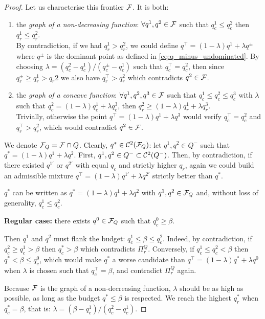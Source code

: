 \begin{proof}
Let us characterise this frontier $\mathcal{F}$. It is both:
\begin{enumerate}
    \item the \emph{graph of a non-decreasing function}: $\forall q^1, q^2\in\mathcal{F}$ such that $q_c^1\leq q_c^2$ then $q_r^1\leq q_r^2$.\\
    By contradiction, if we had $q_r^1 > q_r^2$, we could define $q^\top = (1-\lambda)q^1 + \lambda q^\pm$ where $q^\pm$ is the dominant point as defined in \eqref{eq:q_minus_undominated}. By choosing $\lambda=(q^2_c-q^1_c)/(q^\pm_c-q^1_c)$ such that $q^\top_c = q_c^2$, then since $q_r^\pm \geq q_r^1 > q_r 2$ we also have $q^\top_r > q_r^2$ which contradicts $q^2\in\mathcal{F}$.
    \item the \emph{graph of a concave function}: $\forall q^1, q^2, q^3\in\mathcal{F}$ such that $q_c^1\leq q_c^2 \leq q_c^3$ with $\lambda$ such that $q^2_c = (1-\lambda)q^1_c + \lambda q^3_c$, then $q_r^2 \geq (1-\lambda)q_r^1 + \lambda q_r^3$.\\
    Trivially, otherwise the point $q^\top = (1-\lambda)q^1 + \lambda q^3$ would verify $q^\top_c=q^2_c$ and $q^\top_r > q^2_r$, which would contradict $q^2 \in\mathcal{F}$.
\end{enumerate}

We denote $\mathcal{F}_Q = \mathcal{F} \cap Q$. Clearly, $q^*\in\mathcal{C}^2(\mathcal{F}_Q)$: let $q^1, q^2\in Q^-$ such that $q^* = (1-\lambda)q^1  + \lambda q^2$. First, $q^1, q^2\in Q^-\subset\mathcal{C}^2(Q^-)$. Then, by contradiction, if there existed $q^{1'}$ or $q^{2'}$ with equal $q_c$ and strictly higher $q_r$, again we could build an admissible mixture $q^{\top}=(1-\lambda)q^{1'}  + \lambda q^{2'}$ strictly better than $q^*$.

$q^*$ can be written as $q^* = (1-\lambda)q^1  + \lambda q^2$ with $q^1, q^2\in\mathcal{F}_Q$ and, without loss of generality, $q^1_c \leq q^2_c$.

\textbf{Regular case:} there exists $q^0\in\mathcal{F}_Q$ such that $q^0_c \geq \beta$.

Then $q^1$ and $q^2$ must flank the budget: $q_c^1 \leq \beta \leq q_c^2$. Indeed, by contradiction, if $q_c^2 \geq q_c^1 > \beta$ then $q_c^* > \beta$ which contradicts $\Pi_r^Q$. Conversely, if $q_c^1 \leq q_c^2 < \beta$ then $q^* < \beta \leq q^0_c$, which would make $q^*$ a worse candidate than $q^\top=(1-\lambda)q^* + \lambda q^0$ when $\lambda$ is chosen such that $q_c^\top=\beta$, and contradict $\Pi_r^Q$ again.

Because $\mathcal{F}$ is the graph of a non-decreasing function, $\lambda$ should be as high as possible, as long as the budget $q^*\leq\beta$ is respected. We reach the highest $q_r^*$ when $q^*_c=\beta$, that is: $\lambda=(\beta-q_c^1)/(q_c^2-q_c^1)$.


\end{proof}
